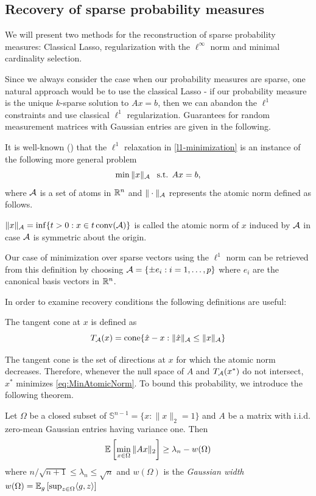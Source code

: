 \documentclass{article} %
\begin{document}
\subsection{Recovery of sparse probability measures}
We will present two methods for the reconstruction of sparse probability measures:  Classical Lasso, regularization with the $\ell^\infty$ norm and minimal cardinality selection.

Since we always consider the case when our probability measures are sparse, one natural approach would be to use the classical Lasso - if our probability measure is the unique $k$-sparse solution to $Ax  = b$, then we can abandon the $\ell^1$ constraints and use classical $\ell^1$ regularization. Guarantees for random measurement matrices with Gaussian entries are given in the following.

It is well-known (\cite{inverse_problems}) that the $\ell^1$ relaxation in \eqref{l1-minimization} is an instance of the following more general problem 
\begin{equation}
\label{eq:MinAtomicNorm}
\min \|x\|_{\mathcal{A}} \:\: \text{ s.t. } Ax = b,
\end{equation}
where $\mathcal{A}$ is a set of atoms in $\mathbb{R}^n$ and $\|\cdot \|_{\mathcal{A}}$ represents the atomic norm defined as follows.
\begin{definition}
$\|x\|_{\mathcal{A}} = \inf\{ t>0: x\in t \operatorname{conv}(\mathcal{A})\}$ is called the atomic norm of $x$ induced by $\mathcal{A}$ in case $\mathcal{A}$ is symmetric about the origin.
\end{definition}
Our case of minimization over sparse vectors using the $\ell^1$ norm can be retrieved from this definition by choosing $\mathcal{A} = \{\pm e_i: i = 1,\dots, p\}$ where $e_i$ are the canonical basis vectors in $\mathbb{R}^n$.

In order to examine recovery conditions the following definitions are useful:
\begin{definition}
The tangent cone at $x$ is defined as 
\begin{equation}
\label{eq:TangentCone}
T_{\mathcal{A}}(x) = \operatorname{cone} \{\hat{x} - x: \|\hat{x}\|_{\mathcal{A}} \leq \|x\|_{\mathcal{A}}\}
\end{equation}
\end{definition}
The tangent cone is the set of directions at $x$ for which the atomic norm decreases. Therefore, whenever the null space of $A$ and $T_{\mathcal{A}}(x^*)$ do not intersect, $x^*$ minimizes \eqref{eq:MinAtomicNorm}. To bound this probability, we introduce the following theorem.

\begin{theorem}
\label{thm:ExpectationBound}
Let $\Omega$ be a closed subset of $\mathbb{S}^{n-1} = \{x: \|x\|_2 = 1\}$ and $A$ be a matrix with i.i.d. zero-mean Gaussian entries having variance one. Then
\begin{equation}
  \mathbb{E} \left[ \min_{x\in \Omega} \|A x\|_2 \right] \geq \lambda_n - w(\Omega)
\end{equation} 
where $n/\sqrt{n+1} \leq \lambda_n\leq \sqrt{n}$ and $w(\Omega)$ is the \emph{Gaussian width}
$w(\Omega) = \mathbb{E}_{g} \left[ \sup_{z\in \Omega} \langle g, z\rangle \right]$
\end{theorem}
\end{document}
